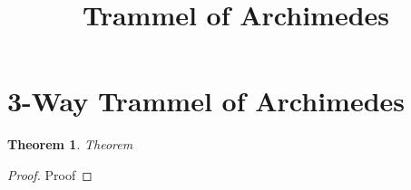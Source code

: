 \documentclass{article}
\date{}
\title{Trammel of Archimedes}
\newtheorem{theorem}{Theorem}[section]
\begin{document}
\maketitle

\section{3-Way Trammel of Archimedes}

\begin{theorem}
Theorem
\end{theorem}

\begin{proof}
Proof
\end{proof}
\end{document}
